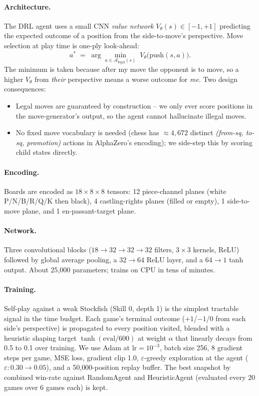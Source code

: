 \documentclass[11pt,a4paper]{article}
\begin{document}
\paragraph{Architecture.} The DRL agent uses a small CNN
\emph{value network} $V_\theta(s) \in [-1, +1]$ predicting the
expected outcome of a position from the side-to-move's perspective.
Move selection at play time is one-ply look-ahead:
\[
   a^{*} \;=\; \arg\min_{a\in\mathcal{A}_{\text{legal}}(s)}\;
                V_\theta\bigl(\text{push}(s, a)\bigr).
\]
The minimum is taken because after my move the opponent is to move,
so a higher $V_\theta$ from \emph{their} perspective means a worse
outcome for \emph{me}. Two design consequences:
\begin{itemize}
  \item Legal moves are guaranteed by construction -- we only ever
    score positions in the move-generator's output, so the agent
    cannot hallucinate illegal moves.
  \item No fixed move vocabulary is needed (chess has $\approx 4{,}672$
    distinct \emph{(from-sq, to-sq, promotion)} actions in AlphaZero's
    encoding); we side-step this by scoring child states directly.
\end{itemize}

\paragraph{Encoding.} Boards are encoded as $18\!\times\!8\!\times\!8$
tensors: 12 piece-channel planes (white P/N/B/R/Q/K then black), 4
castling-rights planes (filled or empty), 1 side-to-move plane, and 1
en-passant-target plane.

\paragraph{Network.} Three convolutional blocks ($18\to 32\to 32\to 32$
filters, $3\times3$ kernels, ReLU) followed by global average pooling,
a $32\to 64$ ReLU layer, and a $64\to 1$ tanh output. About 25{,}000
parameters; trains on CPU in tens of minutes.

\paragraph{Training.} Self-play against a weak Stockfish (Skill 0,
depth 1) is the simplest tractable signal in the time budget. Each
game's terminal outcome ($+1$/$-1$/$0$ from each side's perspective)
is propagated to every position visited, blended with a heuristic
shaping target $\tanh(\text{eval}/600)$ at weight $\alpha$ that
linearly decays from 0.5 to 0.1 over training. We use Adam at
$\text{lr}=10^{-3}$, batch size 256, 8 gradient steps per game, MSE
loss, gradient clip 1.0, $\varepsilon$-greedy exploration at the agent
($\varepsilon: 0.30\!\to\!0.05$), and a 50{,}000-position replay
buffer. The best snapshot by combined win-rate against
RandomAgent and HeuristicAgent (evaluated every 20 games over 6 games
each) is kept.
\end{document}
